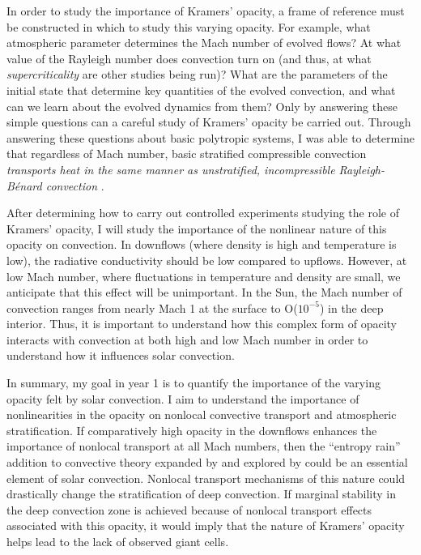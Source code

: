 \documentclass[aasms,12pt]{article}
\newcommand{\RB}{Rayleigh-B\'{e}nard }
\begin{document}
In order to study the importance of Kramers' opacity, a frame of reference must be constructed
in which to study this varying opacity. For example, what atmospheric parameter determines the Mach number
of evolved flows?  At what value of the Rayleigh number
does convection turn on (and thus, at what \emph{supercriticality} are other studies
being run)?  What are the parameters of the initial state that determine key quantities
of the evolved convection, and what can we learn about the evolved dynamics from them?
Only by answering these simple questions can a careful study of Kramers' opacity be carried out.
Through answering these questions about basic polytropic systems, I was able to determine that
regardless of Mach number, basic stratified compressible convection \emph{transports heat
in the same manner as unstratified, incompressible \RB convection} \citep{anders&brown2017}.

After determining how to carry out controlled experiments studying the role of Kramers' opacity,
I will study the importance of the nonlinear nature of this opacity on convection.
In downflows (where density is high and temperature is low), the radiative conductivity
should be low compared to upflows.
However, at low Mach number, where fluctuations in temperature and density are small,
we anticipate that this effect will be unimportant.  In the Sun,
the Mach number of convection ranges from nearly Mach 1 at the surface to O($10^{-5}$) in the
deep interior.  Thus, it is important to understand how this
complex form of opacity interacts with convection at both high and low Mach number in order to understand
how it influences solar convection.

In summary, my goal in year 1 is to quantify the importance of the varying opacity felt by
solar convection. I aim to understand the importance of
nonlinearities in the opacity on nonlocal convective transport and atmospheric stratification.  If
comparatively high opacity in the downflows enhances the importance of nonlocal transport at
all Mach numbers, then the ``entropy rain'' addition to convective theory expanded by
\cite{brandenburg2016} and explored by \cite{kapyla&all2017} could be an essential element
of solar convection.  Nonlocal transport mechanisms of this nature 
could drastically change the stratification of deep convection. If marginal stability in the deep 
convection zone is achieved because of nonlocal transport effects associated with this opacity,
it would imply that the nature of Kramers' opacity helps lead to the lack of observed giant cells.
\end{document}
